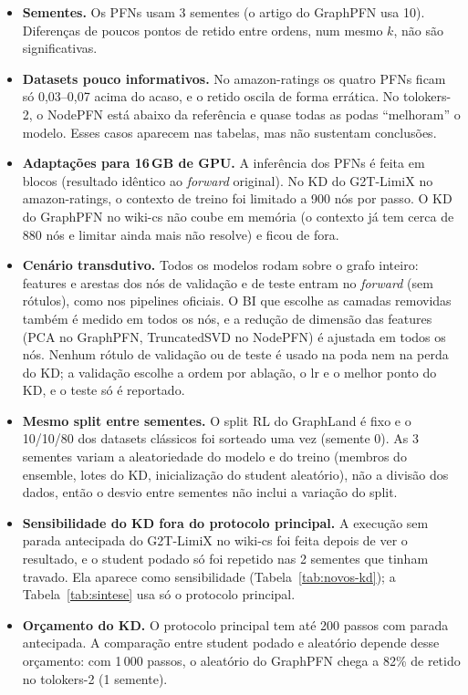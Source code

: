 \documentclass[12pt,a4paper]{article}
\begin{document}
\begin{itemize}
  \item \textbf{Sementes.} Os PFNs usam 3 sementes (o artigo do GraphPFN usa 10). Diferenças de poucos pontos de retido entre ordens, num mesmo $k$, não são significativas.
  \item \textbf{Datasets pouco informativos.} No amazon-ratings os quatro PFNs ficam só 0,03--0,07 acima do acaso, e o retido oscila de forma errática. No tolokers-2, o NodePFN está abaixo da referência e quase todas as podas ``melhoram'' o modelo. Esses casos aparecem nas tabelas, mas não sustentam conclusões.
  \item \textbf{Adaptações para 16\,GB de GPU.} A inferência dos PFNs é feita em blocos (resultado idêntico ao \emph{forward} original). No KD do G2T-LimiX no amazon-ratings, o contexto de treino foi limitado a 900 nós por passo. O KD do GraphPFN no wiki-cs não coube em memória (o contexto já tem cerca de 880 nós e limitar ainda mais não resolve) e ficou de fora.
  \item \textbf{Cenário transdutivo.} Todos os modelos rodam sobre o grafo inteiro: features e arestas dos nós de validação e de teste entram no \emph{forward} (sem rótulos), como nos pipelines oficiais. O BI que escolhe as camadas removidas também é medido em todos os nós, e a redução de dimensão das features (PCA no GraphPFN, TruncatedSVD no NodePFN) é ajustada em todos os nós. Nenhum rótulo de validação ou de teste é usado na poda nem na perda do KD; a validação escolhe a ordem por ablação, o lr e o melhor ponto do KD, e o teste só é reportado.
  \item \textbf{Mesmo split entre sementes.} O split RL do GraphLand é fixo e o 10/10/80 dos datasets clássicos foi sorteado uma vez (semente 0). As 3 sementes variam a aleatoriedade do modelo e do treino (membros do ensemble, lotes do KD, inicialização do student aleatório), não a divisão dos dados, então o desvio entre sementes não inclui a variação do split.
  \item \textbf{Sensibilidade do KD fora do protocolo principal.} A execução sem parada antecipada do G2T-LimiX no wiki-cs foi feita depois de ver o resultado, e o student podado só foi repetido nas 2 sementes que tinham travado. Ela aparece como sensibilidade (Tabela~\ref{tab:novos-kd}); a Tabela~\ref{tab:sintese} usa só o protocolo principal.
  \item \textbf{Orçamento do KD.} O protocolo principal tem até 200 passos com parada antecipada. A comparação entre student podado e aleatório depende desse orçamento: com 1\,000 passos, o aleatório do GraphPFN chega a 82\% de retido no tolokers-2 (1 semente).

\end{itemize}
\end{document}
